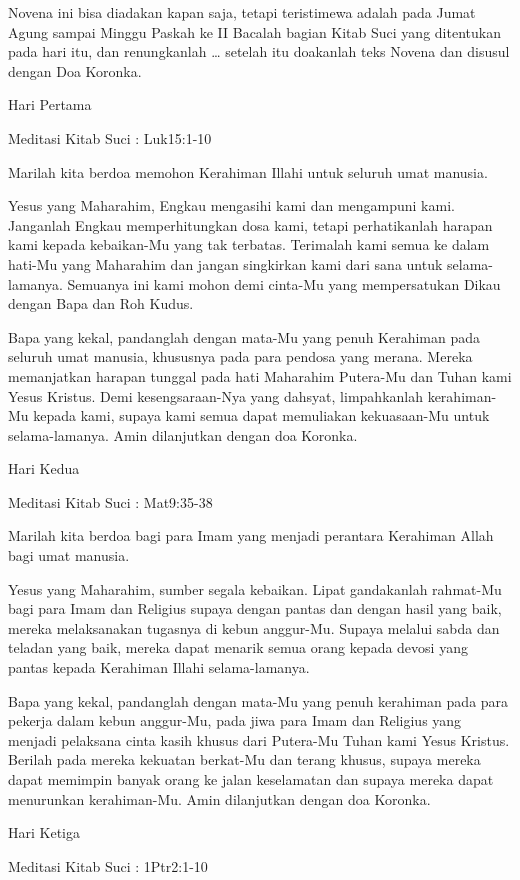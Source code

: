 \documentclass[a5paper,headsepline,titlepage,11pt,nnormalheadings,DIVcalc]{scrbook}
\begin{document}
Novena ini bisa diadakan kapan saja, tetapi teristimewa adalah pada Jumat Agung sampai Minggu Paskah ke II
Bacalah bagian Kitab Suci yang ditentukan pada hari itu, dan renungkanlah … setelah itu doakanlah teks Novena dan disusul dengan Doa Koronka.

Hari Pertama

Meditasi Kitab Suci : Luk15:1-10

Marilah kita berdoa memohon Kerahiman Illahi untuk seluruh umat manusia.

Yesus yang Maharahim, Engkau mengasihi kami dan mengampuni kami. Janganlah Engkau memperhitungkan dosa kami, tetapi perhatikanlah harapan kami kepada kebaikan-Mu yang tak terbatas. Terimalah kami semua ke dalam hati-Mu yang Maharahim dan jangan singkirkan kami dari sana untuk selama-lamanya. Semuanya ini kami mohon demi cinta-Mu yang mempersatukan Dikau dengan Bapa dan Roh Kudus.

Bapa yang kekal, pandanglah dengan mata-Mu yang penuh Kerahiman pada seluruh umat manusia, khususnya pada para pendosa yang merana. Mereka memanjatkan harapan tunggal pada hati Maharahim Putera-Mu dan Tuhan kami Yesus Kristus. Demi kesengsaraan-Nya yang dahsyat, limpahkanlah kerahiman-Mu kepada kami, supaya kami semua dapat memuliakan kekuasaan-Mu untuk selama-lamanya. Amin
dilanjutkan dengan doa Koronka.

Hari Kedua

Meditasi Kitab Suci : Mat9:35-38

Marilah kita berdoa bagi para Imam yang menjadi perantara Kerahiman Allah bagi umat manusia.

Yesus yang Maharahim, sumber segala kebaikan. Lipat gandakanlah rahmat-Mu bagi para Imam dan Religius supaya dengan pantas dan dengan hasil yang baik, mereka melaksanakan tugasnya di kebun anggur-Mu. Supaya melalui sabda dan teladan yang baik, mereka dapat menarik semua orang kepada devosi yang pantas kepada Kerahiman Illahi selama-lamanya.

Bapa yang kekal, pandanglah dengan mata-Mu yang penuh kerahiman pada para pekerja dalam kebun anggur-Mu, pada jiwa para Imam dan Religius yang menjadi pelaksana cinta kasih khusus dari Putera-Mu Tuhan kami Yesus Kristus. Berilah pada mereka kekuatan berkat-Mu dan terang khusus, supaya mereka dapat memimpin banyak orang ke jalan keselamatan dan supaya mereka dapat menurunkan kerahiman-Mu. Amin
dilanjutkan dengan doa Koronka.


Hari Ketiga

Meditasi Kitab Suci : 1Ptr2:1-10
\end{document}
